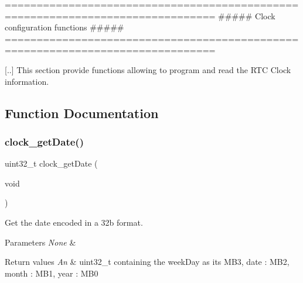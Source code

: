 \begin{DoxyVerb} ===============================================================================
         ##### Clock configuration functions #####
 ===============================================================================

 [..] This section provide functions allowing to program and read the RTC Clock information.\end{DoxyVerb}
 

\subsection{Function Documentation}
\mbox{\label{group___time___date_gabb4d72928cb3d131d40067fb141003aa}} 
\subsubsection{\texorpdfstring{clock\+\_\+get\+Date()}{clock\_getDate()}}
{\footnotesize\ttfamily uint32\+\_\+t clock\+\_\+get\+Date (\begin{DoxyParamCaption}\item[{void}]{ }\end{DoxyParamCaption})}



Get the date encoded in a 32b format. 


\begin{DoxyParams}{Parameters}
{\em None} & \\
\hline
\end{DoxyParams}

\begin{DoxyRetVals}{Return values}
{\em An} & uint32\+\_\+t containing the week\+Day as its M\+B3, date \+: M\+B2, month \+: M\+B1, year \+: M\+B0 \\
\hline
\end{DoxyRetVals}
\mbox{\label{group___time___date_ga03ae6948083c259f6edc0b146f40dc62}} 
